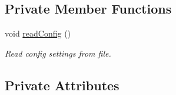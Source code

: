 \subsection*{Private Member Functions}
\begin{DoxyCompactItemize}
\item 
void \hyperlink{class_circular_orbit_belief_ab525b194690af9da600caa56e9216224}{readConfig} ()
\begin{DoxyCompactList}\small\item\em Read config settings from file. \end{DoxyCompactList}\end{DoxyCompactItemize}
\subsection*{Private Attributes}

